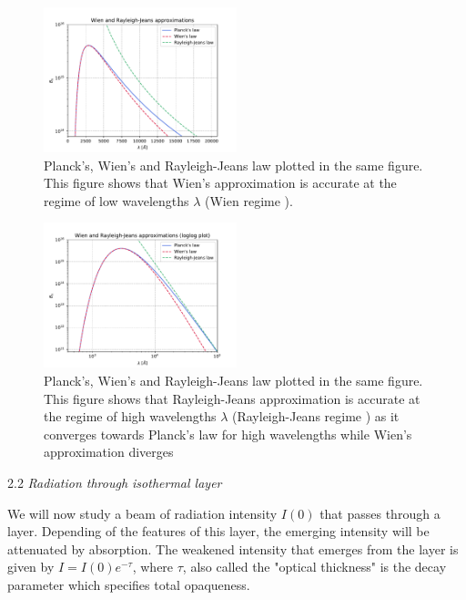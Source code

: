 \documentclass[a4paper,11.5pt,]{article}
\begin{document}
\begin{multicols}{2}
\begin{figure}[H]
	\centering
	\includegraphics[width=0.5\textwidth]{SSA/figures/planckapprox.pdf}
	\caption{Planck's, Wien's and Rayleigh-Jeans law plotted in the same figure. This figure shows that Wien's approximation is accurate at the regime of low wavelengths $\lambda$ (Wien regime ).}
	\label{fig:15}
\end{figure}


\begin{figure}[H]
	\centering
	\includegraphics[width=0.5\textwidth]{SSA/figures/planckapproxlog.pdf}
	\caption{Planck's, Wien's and Rayleigh-Jeans law plotted in the same figure. This figure shows that Rayleigh-Jeans approximation is accurate at the regime of high wavelengths $\lambda$ (Rayleigh-Jeans regime ) as it converges towards Planck's law for high wavelengths while Wien's approximation diverges}
	\label{fig:16}
\end{figure}

\begin{center}
2.2\textit{ Radiation through isothermal layer}
\end{center}
We will now study a beam of radiation intensity $I(0)$ that passes through a layer. Depending of the features of this layer, the emerging intensity will be attenuated by absorption. The weakened intensity that emerges from the layer is given by $I = I(0) e^{- \tau}$, where $\tau$, also called the "optical thickness" is the decay parameter which specifies total opaqueness. 




\end{multicols}
\end{document}
